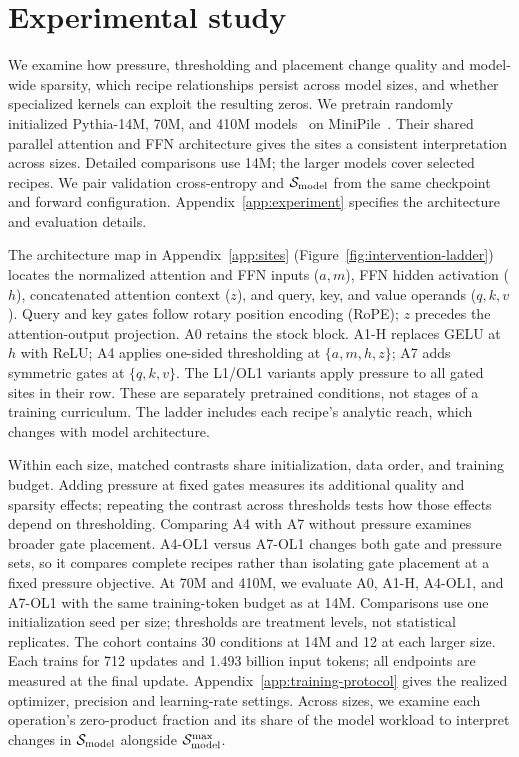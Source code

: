 \section{Experimental study}
\label{sec:experiments}

We examine how pressure, thresholding and placement change quality and
model-wide sparsity, which recipe relationships persist across model sizes,
and whether specialized kernels can exploit the resulting zeros.
We pretrain randomly initialized Pythia-14M, 70M, and 410M
models~\citep{biderman2023pythia} on MiniPile~\citep{kaddour2023minipile}.
Their shared parallel attention and FFN architecture gives the sites a
consistent interpretation across sizes. Detailed comparisons use 14M;
the larger models cover selected recipes. We pair validation cross-entropy
and $\mathcal{S}_{\mathrm{model}}$ from the same checkpoint and forward configuration.
Appendix~\ref{app:experiment} specifies the architecture and evaluation details.

The architecture map in Appendix~\ref{app:sites}
(Figure~\ref{fig:intervention-ladder}) locates the normalized attention and
FFN inputs ($a,m$), FFN hidden activation ($h$), concatenated attention
context ($z$), and query, key, and value operands ($q,k,v$).
Query and key gates follow rotary position encoding (RoPE); $z$ precedes
the attention-output projection. A0 retains the stock block. A1-H replaces
GELU at $h$ with ReLU; A4 applies one-sided thresholding at $\{a,m,h,z\}$;
A7 adds symmetric gates at $\{q,k,v\}$. The L1/OL1 variants apply pressure
to all gated sites in their row. These are separately pretrained conditions,
not stages of a training curriculum. The ladder includes each recipe's
analytic reach, which changes with model architecture.

Within each size, matched contrasts share initialization, data order, and
training budget. Adding pressure at fixed gates measures its additional
quality and sparsity effects; repeating the contrast across thresholds tests
how those effects depend on thresholding. Comparing A4 with A7 without
pressure examines broader gate placement. A4-OL1 versus A7-OL1 changes both
gate and pressure sets, so it compares complete recipes rather than isolating
gate placement at a fixed pressure objective. At 70M and 410M, we evaluate
A0, A1-H, A4-OL1, and A7-OL1 with the same training-token budget as at 14M. Comparisons use one initialization seed
per size; thresholds are treatment levels, not statistical replicates.
The cohort contains 30 conditions at 14M and 12 at each larger size.
Each trains for 712 updates and 1.493 billion input tokens; all endpoints are
measured at the final update. Appendix~\ref{app:training-protocol} gives the
realized optimizer, precision and learning-rate settings.
Across sizes, we examine each operation's zero-product fraction and its share
of the model workload to interpret changes in $\mathcal{S}_{\mathrm{model}}$ alongside $\mathcal{S}_{\mathrm{model}}^{\max}$.

